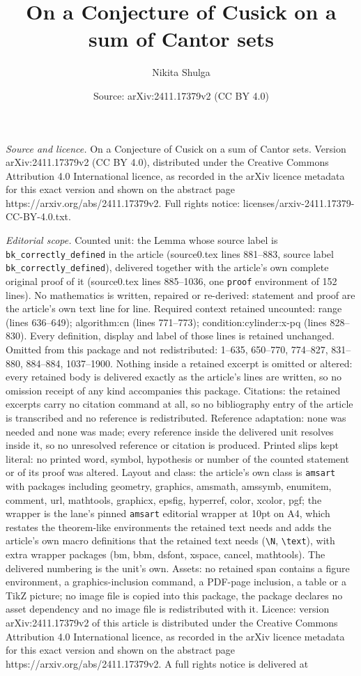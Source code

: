 \documentclass[10pt,a4paper]{amsart}
\title[On a Conjecture of Cusick on a sum of Cantor sets]{On a Conjecture of Cusick on a sum of Cantor sets}
\author{Nikita Shulga}
\date{Source: arXiv:2411.17379v2 (CC BY 4.0)}
\begin{document}
\maketitle

\noindent\emph{Source and licence.} On a Conjecture of Cusick on a sum of Cantor sets. Version arXiv:2411.17379v2 (CC BY 4.0), distributed under the Creative Commons Attribution 4.0 International licence, as recorded in the arXiv licence metadata for this exact version and shown on the abstract page https://arxiv.org/abs/2411.17379v2. Full rights notice: licenses/arxiv-2411.17379-CC-BY-4.0.txt.\par\smallskip

\noindent\textit{Editorial scope.} Counted unit: the Lemma whose source label is \texttt{bk\_correctly\_defined} in the article (source0.tex lines 881--883, source label \texttt{bk\_correctly\_defined}), delivered together with the article's own complete original proof of it (source0.tex lines 885--1036, one \texttt{proof} environment of 152 lines). No mathematics is written, repaired or re-derived: statement and proof are the article's own text line for line. Required context retained uncounted: range (lines 636--649); algorithm:cn (lines 771--773); condition:cylinder:x-pq (lines 828--830). Every definition, display and label of those lines is retained unchanged. Omitted from this package and not redistributed: 1--635, 650--770, 774--827, 831--880, 884--884, 1037--1900. Nothing inside a retained excerpt is omitted or altered: every retained body is delivered exactly as the article's lines are written, so no omission receipt of any kind accompanies this package. Citations: the retained excerpts carry no citation command at all, so no bibliography entry of the article is transcribed and no reference is redistributed. Reference adaptation: none was needed and none was made; every reference inside the delivered unit resolves inside it, so no unresolved reference or citation is produced. Printed slips kept literal: no printed word, symbol, hypothesis or number of the counted statement or of its proof was altered. Layout and class: the article's own class is \texttt{amsart} with packages including geometry, graphics, amsmath, amssymb, enumitem, comment, url, mathtools, graphicx, epsfig, hyperref, color, xcolor, pgf; the wrapper is the lane's pinned \texttt{amsart} editorial wrapper at 10pt on A4, which restates the theorem-like environments the retained text needs and adds the article's own macro definitions that the retained text needs (\texttt{\textbackslash N}, \texttt{\textbackslash text}), with extra wrapper packages (bm, bbm, dsfont, xspace, cancel, mathtools). The delivered numbering is the unit's own. Assets: no retained span contains a figure environment, a graphics-inclusion command, a PDF-page inclusion, a table or a TikZ picture; no image file is copied into this package, the package declares no asset dependency and no image file is redistributed with it. Licence: version arXiv:2411.17379v2 of this article is distributed under the Creative Commons Attribution 4.0 International licence, as recorded in the arXiv licence metadata for this exact version and shown on the abstract page https://arxiv.org/abs/2411.17379v2. A full rights notice is delivered at 
\end{document}
